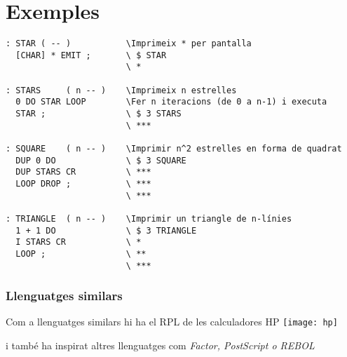 \documentclass{beamer}
\begin{document}
\section{Exemples}

\begin{frame}[fragile]
    
    \begin{lstlisting}[frame=single, basicstyle=\tiny\ttfamily]
: STAR ( -- )           \Imprimeix * per pantalla          
  [CHAR] * EMIT ;       \ $ STAR
                        \ *

: STARS     ( n -- )    \Imprimeix n estrelles
  0 DO STAR LOOP        \Fer n iteracions (de 0 a n-1) i executa
  STAR ;                \ $ 3 STARS
                        \ ***
  
: SQUARE    ( n -- )    \Imprimir n^2 estrelles en forma de quadrat
  DUP 0 DO              \ $ 3 SQUARE
  DUP STARS CR          \ ***
  LOOP DROP ;           \ ***
                        \ ***
  
: TRIANGLE  ( n -- )    \Imprimir un triangle de n-línies
  1 + 1 DO              \ $ 3 TRIANGLE
  I STARS CR            \ *
  LOOP ;                \ **
                        \ ***
    \end{lstlisting}
\end{frame}

\begin{frame}
    \frametitle{Llenguatges similars}
    Com a llenguatges similars hi ha el RPL de les calculadores HP
    \texttt{[image: hp]}
    
    i també ha inspirat altres llenguatges com \emph{Factor, PostScript o REBOL}
\end{frame}
\end{document}
